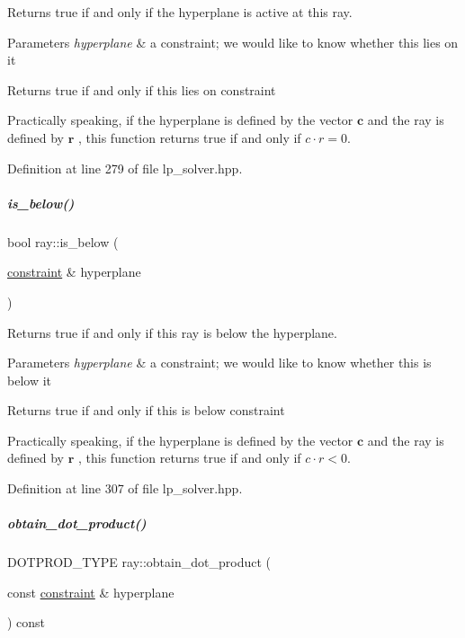 Returns {\ttfamily true} if and only if the hyperplane is active at this ray. 


\begin{DoxyParams}{Parameters}
{\em hyperplane} & a constraint; we would like to know whether {\ttfamily this} lies on it \\
\hline
\end{DoxyParams}
\begin{DoxyReturn}{Returns}
true if and only if {\ttfamily this} lies on {\ttfamily constraint} 
\end{DoxyReturn}
Practically speaking, if the hyperplane is defined by the vector $ \mathbf c $ and the ray is defined by $ \mathbf r $ , this function returns true if and only if $ c\cdot r = 0 $. 

Definition at line 279 of file lp\+\_\+solver.\+hpp.

\mbox{\label{group___c_l_s_solvers_a08f0af168bb0a86db612fdd3ce22045b}} 
\subparagraph{\texorpdfstring{is\+\_\+below()}{is\_below()}}
{\footnotesize\ttfamily bool ray\+::is\+\_\+below (\begin{DoxyParamCaption}\item[{\hyperlink{group___c_l_s_solvers_classconstraint}{constraint} \&}]{hyperplane }\end{DoxyParamCaption})\hspace{0.3cm}{\ttfamily [inline]}}



Returns {\ttfamily true} if and only if this ray is below the hyperplane. 


\begin{DoxyParams}{Parameters}
{\em hyperplane} & a constraint; we would like to know whether {\ttfamily this} is below it \\
\hline
\end{DoxyParams}
\begin{DoxyReturn}{Returns}
true if and only if {\ttfamily this} is below {\ttfamily constraint} 
\end{DoxyReturn}
Practically speaking, if the hyperplane is defined by the vector $ \mathbf c $ and the ray is defined by $ \mathbf r $ , this function returns true if and only if $ c\cdot r < 0 $. 

Definition at line 307 of file lp\+\_\+solver.\+hpp.

\mbox{\label{group___c_l_s_solvers_a25f56f0f7acafe000f98550af47b7da9}} 
\subparagraph{\texorpdfstring{obtain\+\_\+dot\+\_\+product()}{obtain\_dot\_product()}}
{\footnotesize\ttfamily D\+O\+T\+P\+R\+O\+D\+\_\+\+T\+Y\+PE ray\+::obtain\+\_\+dot\+\_\+product (\begin{DoxyParamCaption}\item[{const \hyperlink{group___c_l_s_solvers_classconstraint}{constraint} \&}]{hyperplane }\end{DoxyParamCaption}) const}



